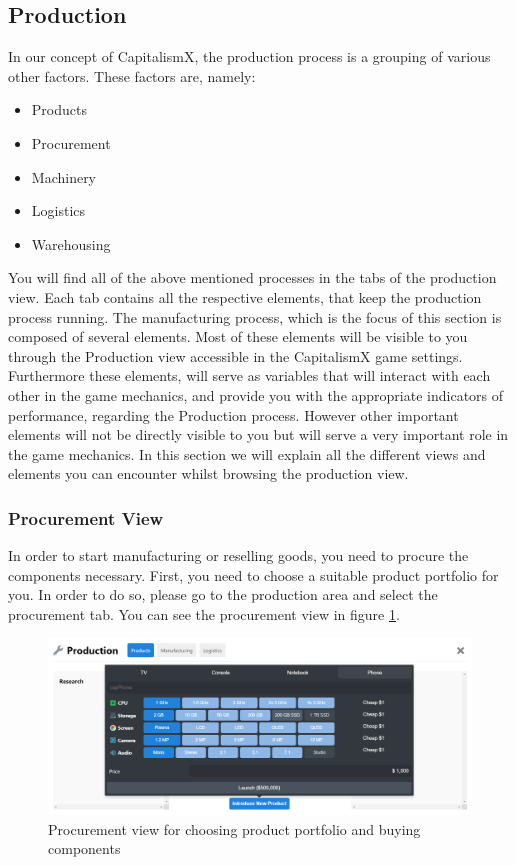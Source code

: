 \subsection{Production}
\label{production_manual}

In our concept of CapitalismX, the production process is a grouping of various other factors. These factors are, namely: 
\begin{itemize} 
\item Products 
\item Procurement  
\item Machinery 
\item Logistics 
\item Warehousing 
\end{itemize}
You will find all of the above mentioned processes in the tabs of the production view. Each tab contains all the respective elements, that keep the production process running.
The manufacturing process, which is the focus of this section is composed of several elements. Most of these elements will be visible to you through the Production view accessible in the CapitalismX game settings. Furthermore these elements, will serve as variables that will interact with each other in the game mechanics, and provide you with the appropriate indicators of performance, regarding the Production process. However other important elements will not be directly visible to you but will serve a very important role in the game mechanics. In this section we will explain all the different views and elements you can encounter whilst browsing the production view.

\subsubsection{Procurement View}
\label{sub:ProcurementView}
In order to start manufacturing or reselling goods, you need to procure the components necessary. First, you need to choose a suitable product portfolio for you. In order to do so, please go to the production area and select the procurement tab. You can see the procurement view in figure \ref{fig:procurementView}. 

\begin{figure}[h]
    \centering
    \includegraphics[width=\textwidth]{images/procurementView.png}
    \caption{Procurement view for choosing product portfolio and buying components}
    \label{fig:procurementView}
\end{figure}

